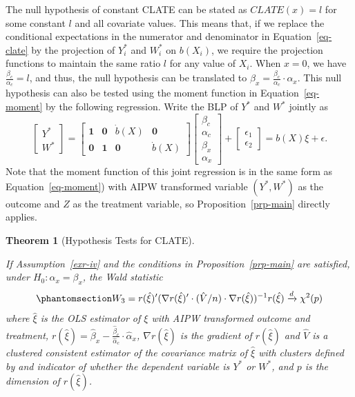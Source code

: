 \documentclass[
  12pt,
  12pt]{article}
\numberwithin{equation}{section}
\theoremstyle{definition}
\theoremstyle{plain}
\theoremstyle{plain}
\newtheorem{theorem}{Theorem}[section]
\theoremstyle{remark}
\begin{document}
The null hypothesis of constant CLATE can be stated as \(CLATE(x) = l\)
for some constant \(l\) and all covariate values. This means that, if we
replace the conditional expectations in the numerator and denominator in
Equation~\ref{eq-clate} by the projection of \(Y^*_i\) and \(W^*_i\) on
\(b(X_i)\), we require the projection functions to maintain the same
ratio \(l\) for any value of \(X_i\). When \(x = 0\), we have
\(\frac{\beta_c}{\alpha_c} = l\), and thus, the null hypothesis can be
translated to \(\beta_x = \frac{\beta_c}{\alpha_c} \cdot \alpha_x\).
This null hypothesis can also be tested using the moment function in
Equation~\ref{eq-moment} by the following regression. Write the BLP of
\(Y^*\) and \(W^*\) jointly as \[
\begin{bmatrix} Y^* \\ W^* \end{bmatrix} = \begin{bmatrix} \mathbf{1} & \mathbf{0} & \dot{b}(X) & \mathbf{0} \\ \mathbf{0} & \mathbf{1} & \mathbf{0} & \dot{b}(X)\end{bmatrix} \begin{bmatrix}\beta_c \\ \alpha_c \\ \beta_x \\ \alpha_x \end{bmatrix} + \begin{bmatrix} \epsilon_{1} \\ \epsilon_{2}  \end{bmatrix} = b(X) \xi + \epsilon.
\] Note that the moment function of this joint regression is in the same
form as Equation~\ref{eq-moment}) with AIPW transformed variable
\((Y^*, W^*)\) as the outcome and \(Z\) as the treatment variable, so
Proposition~\ref{prp-main} directly applies.

\begin{theorem}[Hypothesis Tests for
CLATE]\protect\hypertarget{thm-clate}{}\label{thm-clate}

If Assumption~\ref{exr-iv} and the conditions in
Proposition~\ref{prp-main} are satisfied, under
\(H_0: \alpha_x = \beta_x\), the Wald statistic
\begin{equation}\phantomsection\label{eq-wald3}{
W_3 = r(\hat\xi)'(\nabla r(\hat\xi)' \cdot (\hat{V}/n) \cdot \nabla r(\hat\xi))^{-1}r(\hat\xi) \xrightarrow{d} \chi^2(p)
}\end{equation} where \(\hat\xi\) is the OLS estimator of \(\xi\) with
AIPW transformed outcome and treatment,
\(r(\hat\xi) = \hat\beta_x - \frac{\hat\beta_c}{\hat\alpha_c} \cdot \hat\alpha_x\),
\(\nabla r(\hat\xi)\) is the gradient of \(r(\hat\xi)\) and \(\hat{V}\)
is a clustered consistent estimator of the covariance matrix of
\(\hat\xi\) with clusters defined by and indicator of whether the
dependent variable is \(Y^*\) or \(W^*\), and \(p\) is the dimension of
\(r(\hat\xi)\).

\end{theorem}
\end{document}
